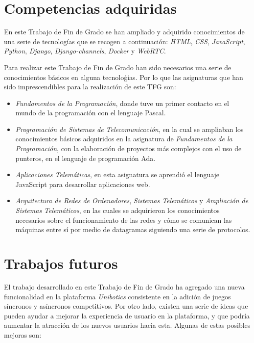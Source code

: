 \documentclass[a4paper, 12pt]{book}
\begin{document}


\section{Competencias adquiridas}
\label{sec:lecciones_aprendidas}

En este Trabajo de Fin de Grado se han ampliado y adquirido conocimientos de una serie de tecnologías que se recogen a continuación: \emph{HTML}, \emph{CSS}, \emph{JavaScript}, \emph{Python}, \emph{Django}, \emph{Django-channels}, \emph{Docker} y \emph{WebRTC}.

Para realizar este Trabajo de Fin de Grado han sido necesarios una serie de conocimientos básicos en alguna tecnoloǵias. Por lo que las asignaturas que han sido imprescendibles para la realización de este TFG son:

\begin{itemize}
\item \emph{Fundamentos de la Programación}, donde tuve un primer contacto en el mundo de la programación con el lenguaje Pascal.
\item \emph{Programación de Sistemas de Telecomunicación}, en la cual se ampliaban los conocimientos básicos adquiridos en la asignatura de \emph{Fundamentos de la Programación}, con la elaboración de proyectos más complejos con el uso de punteros, en el lenguaje de programación Ada.
\item \emph{Aplicaciones Telemáticas}, en esta asignatura se aprendió el lenguaje JavaScript para desarrollar aplicaciones web.
\item \emph{Arquitectura de Redes de Ordenadores}, \emph{Sistemas Telemáticos} y \emph{Ampliación de Sistemas Telemáticos}, en las cuales se adquirieron los conocimientos necesarios sobre el funcionamiento de las redes y cómo se comunican las máquinas entre sí por medio de datagramas siguiendo una serie de protocolos.
\end{itemize}


\section{Trabajos futuros}
\label{sec:trabajos_futuros}

El trabajo desarrollado en este Trabajo de Fin de Grado ha agregado una nueva funcionalidad en la plataforma \emph{Unibotics} consistente en la adición de juegos síncronos y asíncronos competitivos. Por otro lado, existen una serie de ideas que pueden ayudar a mejorar la experiencia de usuario en la plataforma, y que podría aumentar la atracción de los nuevos usuarios hacia esta. Algunas de estas posibles mejoras son:
\end{document}
